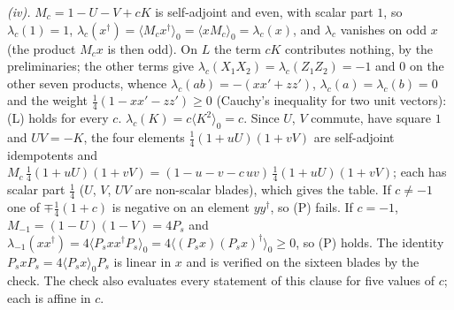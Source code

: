 \emph{(iv).} $M_{c} = 1 - U - V + cK$ is self-adjoint and even, with scalar part $1$, so $\lambda_{c}(1) = 1$, $\lambda_{c}(x^{\dagger}) = \langle M_{c}x^{\dagger}\rangle_{0} = \langle xM_{c}\rangle_{0} = \lambda_{c}(x)$, and $\lambda_{c}$ vanishes on odd $x$ (the product $M_{c}x$ is then odd). On $L$ the term $cK$ contributes nothing, by the preliminaries; the other terms give $\lambda_{c}(X_{1}X_{2}) = \lambda_{c}(Z_{1}Z_{2}) = -1$ and $0$ on the other seven products, whence $\lambda_{c}(ab) = -(xx' + zz')$, $\lambda_{c}(a) = \lambda_{c}(b) = 0$ and the weight $\tfrac14(1 - xx' - zz') \ge 0$ (Cauchy's inequality for two unit vectors): (L) holds for every $c$. $\lambda_{c}(K) = c\langle K^{2}\rangle_{0} = c$. Since $U$, $V$ commute, have square $1$ and $UV = -K$, the four elements $\tfrac14(1 + uU)(1 + vV)$ are self-adjoint idempotents and $M_{c}\,\tfrac14(1 + uU)(1 + vV) = (1 - u - v - c\,uv)\,\tfrac14(1 + uU)(1 + vV)$; each has scalar part $\tfrac14$ ($U$, $V$, $UV$ are non-scalar blades), which gives the table. If $c \ne -1$ one of $\mp\tfrac14(1 + c)$ is negative on an element $yy^{\dagger}$, so (P) fails. If $c = -1$, $M_{-1} = (1 - U)(1 - V) = 4P_{s}$ and $\lambda_{-1}(xx^{\dagger}) = 4\langle P_{s}xx^{\dagger}P_{s}\rangle_{0} = 4\langle(P_{s}x)(P_{s}x)^{\dagger}\rangle_{0} \ge 0$, so (P) holds. The identity $P_{s}xP_{s} = 4\langle P_{s}x\rangle_{0}P_{s}$ is linear in $x$ and is verified on the sixteen blades by the check. The check also evaluates every statement of this clause for five values of $c$; each is affine in $c$.


